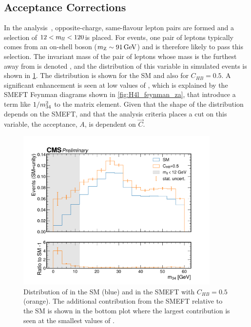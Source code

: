 \subsection{Acceptance Corrections}\label{sec:acceptance_corrections}

In the \Hfl analysis~\cite{CMS:2021ugl}, opposite-charge, same-flavour lepton pairs are formed and a selection of $12 < m_{ll} < 120$\GeV is placed. For \Hfl events, one pair of leptons typically comes from an on-shell \PZ boson ($m_{\mathrm{Z}} \sim 91\,\text{Ge\hspace{-.08em}V}$) and is therefore likely to pass this selection. The invariant mass of the pair of leptons whose mass is the furthest away from \mZ is denoted \mthreefour, and the distribution of this variable in simulated \Hfl events is shown in \cref{fig:h4l_m34}. The distribution is shown for the SM and also for $C_{HB}=0.5$. A significant enhancement is seen at low values of \mthreefour, which is explained by the SMEFT Feynman diagrams shown in \cref{fig:H4l_feynman_za}, that introduce a term like $1/m_{34}^2$ to the matrix element. Given that the shape of the \mthreefour distribution depends on the SMEFT, and that the analysis criteria places a cut on this variable, the acceptance, $A$, is dependent on $\vec{C}$.

\begin{figure}
  \centering
  \includegraphics[width=0.9\textwidth]{Figures/EFT/H4l_m34_CMS.pdf}
  \caption[Distribution of \mthreefour in the SM and in the SMEFT with $C_{HB}=0.5$]{Distribution of \mthreefour in the SM (blue) and in the SMEFT with $C_{HB}=0.5$ (orange). The additional contribution from the SMEFT relative to the SM is shown in the bottom plot where the largest contribution is seen at the smallest values of \mthreefour.}\label{fig:h4l_m34}
\end{figure}

